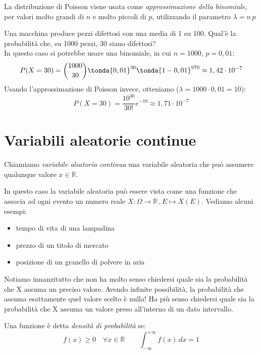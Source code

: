\begin{osservazione} La distribuzione di Poisson viene usata come \emph{approssimazione della binomiale}, per valori molto grandi di \(n\) e molto piccoli di \(p\), utilizzando il parametro \(\lambda = n\,p\)
\end{osservazione}

\begin{esempio}
Una macchina produce pezzi difettosi con una media di 1 su 100. Qual'è la probabilità che, su 1000 pezzi, 30 siano difettosi?\\[5pt]
In questo caso si potrebbe usare una binomiale, in cui \(n=1000\), \(p=0,01\):
\[P(X=30) = \binom{1000}{30} \tonda{0,01}^{30} \tonda{1-0,01}^{970} \approx 1,42\cdot 10^{-7} \]
Usando l'approssimazione di Poisson invece, otteniamo (\(\lambda=1000\cdot 0,01=10\)):
\[P(X=30) = \dfrac{10^{30}}{30!} e^{-10} \approx 1,71\cdot 10^{-7} \]
\end{esempio}


\section{Variabili aleatorie continue}
\label{sec:continue}

\begin{definizione} Chiamiamo \emph{variabile aleatoria continua} una variabile aleatoria che può assumere qualunque valore \(x \in \mathbb{R}\).
\end{definizione}

In questo caso la variabile aleatoria può essere vista come una funzione che associa ad ogni evento un numero reale \(X:\Omega \longrightarrow \mathbb{R}\,, E \longmapsto X(E) \). Vediamo alcuni esempi:
\begin{itemize}
\item tempo di vita di una lampadina
\item prezzo di un titolo di mercato
\item  posizione di un granello di polvere in aria
\end{itemize}

Notiamo innanzitutto che non ha molto senso chiedersi quale sia la probabilità che X assuma un preciso valore. Avendo infinite possibilità, la probabilità che assuma esattamente quel valore scelto è nulla! Ha più senso chiedersi quale sia la probabilità che X assuma un valore preso all'interno di un dato intervallo.

\begin{definizione} Una funzione è detta \emph{densità di probabilità} se:
\[ \boxed{f(x) \geq 0 \quad \forall x \in \mathbb{R}} \qquad \boxed{ \int_{-\infty}^{+\infty} f(x)\, dx = 1}\]
\end{definizione}

